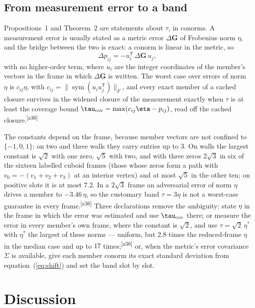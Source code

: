 \documentclass[preprint,pdf]{iucr}          %
\newcommand{\Gmet}{\mathbf{G}}
\newcommand{\sym}{\operatorname{sym}}
\newcommand{\chk}[1]{\textsuperscript{[#1]}}
\begin{document}
\subsection{From measurement error to a band}
\label{sec:noise}
Propositions~1 and Theorem~2 are statements about $\tau$, in conorms. A measurement error is usually stated as a metric error $\Delta\Gmet$ of Frobenius norm $\eta$, and the bridge between the two is exact: a conorm is linear in the metric, so
\begin{equation}
\Delta p_{ij}=-u_i^{\mathsf T}\,\Delta\Gmet\,u_j ,
\label{eq:shift}
\end{equation}
with no higher-order term, where $u_i$ are the integer coordinates of the member's vectors in the frame in which $\Delta\Gmet$ is written. The worst case over errors of norm $\eta$ is $c_{ij}\eta$, with $c_{ij}=\|\sym(u_iu_j^{\mathsf T})\|_F$, and every exact member of a cached closure survives in the widened closure of the measurement exactly when $\tau$ is at least the coverage bound $\tau_{\rm cov}=\max(c_{ij}\eta-p_{ij})$, read off the cached closure.\chk{z36}

The constants depend on the frame, because member vectors are not confined to $\{-1,0,1\}$: on two and three walls they carry entries up to $3$. On walls the largest constant is $\sqrt2$ with one zero, $\sqrt5$ with two, and with three zeros $2\sqrt3$ in six of the sixteen labelled cuboid frames (those whose zeros form a path with $v_0=-(v_1+v_2+v_3)$ at an interior vertex) and at most $\sqrt5$ in the other ten; on positive slots it is at most $7.2$. In a $2\sqrt3$ frame an adversarial error of norm $\eta$ drives a member to $-3.46\,\eta$, so the customary band $\tau=3\eta$ is not a worst-case guarantee in every frame.\chk{z36} Three declarations remove the ambiguity: state $\eta$ in the frame in which the error was estimated and use $\tau_{\rm cov}$ there; or measure the error in every member's own frame, where the constant is $\sqrt2$, and use $\tau=\sqrt2\,\eta^*$ with $\eta^*$ the largest of these norms --- uniform, but $2.8$ times the reduced-frame $\eta$ in the median case and up to $17$ times;\chk{z36} or, when the metric's error covariance $\Sigma$ is available, give each member conorm its exact standard deviation from equation~(\ref{eq:shift}) and set the band slot by slot.

\section{Discussion}
\end{document}
